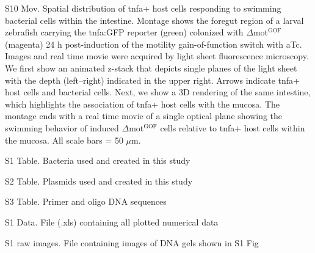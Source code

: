 S10 Mov. Spatial distribution of tnfa+ host cells responding to swimming bacterial cells within the intestine. 
Montage shows the foregut region of a larval zebrafish carrying the tnfa:GFP reporter (green) colonized with $\Delta$mot$^{\text{GOF}}$ (magenta) 24 h post-induction of the motility gain-of-function switch with aTc. Images and real time movie were acquired by light sheet fluorescence microscopy. We first show an animated z-stack that depicts single planes of the light sheet with the depth (left–right) indicated in the upper right. Arrows indicate tnfa+ host cells and bacterial cells. Next, we show a 3D rendering of the same intestine, which highlights the association of tnfa+ host cells with the mucosa. The montage ends with a real time movie of a single optical plane showing the swimming behavior of induced $\Delta$mot$^{\text{GOF}}$ cells relative to tnfa+ host cells within the mucosa. All scale bars = 50 $\mu$m.

S1 Table. Bacteria used and created in this study

S2 Table. Plasmids used and created in this study

S3 Table. Primer and oligo DNA sequences

S1 Data. File (.xls) containing all plotted numerical data

S1 raw images. File containing images of DNA gels shown in S1 Fig

%
